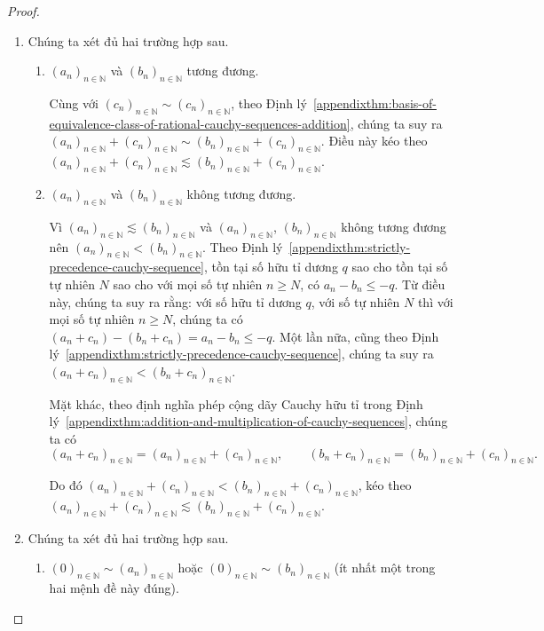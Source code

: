 \begin{proof}
    \begin{enumerate}[label={(\roman*)}]
        \item Chúng ta xét đủ hai trường hợp sau.
              \begin{enumerate}[label={\textbf{Trường hợp \arabic*.}},itemindent=1cm]
                  \item ${(a_{n})}_{n\in\mathbb{N}}$ và ${(b_{n})}_{n\in\mathbb{N}}$ tương đương.

                        Cùng với ${(c_{n})}_{n\in\mathbb{N}}\sim {(c_{n})}_{n\in\mathbb{N}}$, theo Định lý~\ref{appendixthm:basis-of-equivalence-class-of-rational-cauchy-sequences-addition}, chúng ta suy ra ${(a_{n})}_{n\in\mathbb{N}} + {(c_{n})}_{n\in\mathbb{N}}\sim {(b_{n})}_{n\in\mathbb{N}} + {(c_{n})}_{n\in\mathbb{N}}$. Điều này kéo theo ${(a_{n})}_{n\in\mathbb{N}} + {(c_{n})}_{n\in\mathbb{N}}\lesssim {(b_{n})}_{n\in\mathbb{N}} + {(c_{n})}_{n\in\mathbb{N}}$.
                  \item ${(a_{n})}_{n\in\mathbb{N}}$ và ${(b_{n})}_{n\in\mathbb{N}}$ không tương đương.

                        Vì ${(a_{n})}_{n\in\mathbb{N}}\lesssim {(b_{n})}_{n\in\mathbb{N}}$ và ${(a_{n})}_{n\in\mathbb{N}}$, ${(b_{n})}_{n\in\mathbb{N}}$ không tương đương nên ${(a_{n})}_{n\in\mathbb{N}} < {(b_{n})}_{n\in\mathbb{N}}$. Theo Định lý~\ref{appendixthm:strictly-precedence-cauchy-sequence}, tồn tại số hữu tỉ dương $q$ sao cho tồn tại số tự nhiên $N$ sao cho với mọi số tự nhiên $n\geq N$, có $a_{n} - b_{n}\leq -q$. Từ điều này, chúng ta suy ra rằng: với số hữu tỉ dương $q$, với số tự nhiên $N$ thì với mọi số tự nhiên $n\geq N$, chúng ta có $(a_{n} + c_{n}) - (b_{n} + c_{n}) = a_{n} - b_{n}\leq -q$. Một lần nữa, cũng theo Định lý~\ref{appendixthm:strictly-precedence-cauchy-sequence}, chúng ta suy ra ${(a_{n} + c_{n})}_{n\in\mathbb{N}} < {(b_{n} + c_{n})}_{n\in\mathbb{N}}$.

                        Mặt khác, theo định nghĩa phép cộng dãy Cauchy hữu tỉ trong Định lý~\ref{appendixthm:addition-and-multiplication-of-cauchy-sequences}, chúng ta có
                        \[
                            {(a_{n} + c_{n})}_{n\in\mathbb{N}} = {(a_{n})}_{n\in\mathbb{N}} + {(c_{n})}_{n\in\mathbb{N}},\qquad  {(b_{n} + c_{n})}_{n\in\mathbb{N}} = {(b_{n})}_{n\in\mathbb{N}} + {(c_{n})}_{n\in\mathbb{N}}.
                        \]

                        Do đó ${(a_{n})}_{n\in\mathbb{N}} + {(c_{n})}_{n\in\mathbb{N}} < {(b_{n})}_{n\in\mathbb{N}} + {(c_{n})}_{n\in\mathbb{N}}$, kéo theo ${(a_{n})}_{n\in\mathbb{N}} + {(c_{n})}_{n\in\mathbb{N}}\lesssim {(b_{n})}_{n\in\mathbb{N}} + {(c_{n})}_{n\in\mathbb{N}}$.
              \end{enumerate}
        \item Chúng ta xét đủ hai trường hợp sau.
              \begin{enumerate}[label={\textbf{Trường hợp \arabic*.}},itemindent=1cm]
                  \item ${(0)}_{n\in\mathbb{N}}\sim {(a_{n})}_{n\in\mathbb{N}}$ hoặc ${(0)}_{n\in\mathbb{N}} \sim {(b_{n})}_{n\in\mathbb{N}}$ (ít nhất một trong hai mệnh đề này đúng).


\end{enumerate}
\end{enumerate}
\end{proof}

